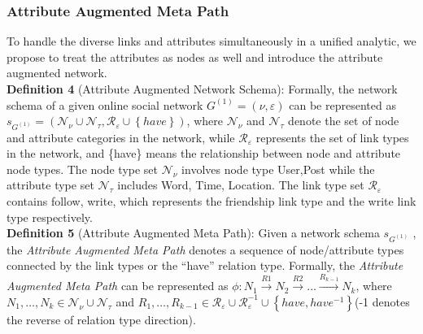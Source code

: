 \documentclass{article}
\begin{document}
\subsubsection{Attribute Augmented Meta Path}
\indent To handle the diverse links
and attributes simultaneously in a unified analytic, we propose to
treat the attributes as nodes as well and introduce the attribute
augmented network.\\
\textbf{Definition 4} (Attribute Augmented Network Schema): Formally, the network schema of a given online social network $G^{(1)} = (\nu, \varepsilon)$ can be represented as $s_{G^{(1)}} = (\mathcal{N}_{\nu}\cup\mathcal{N}_{\tau}, \mathcal{R}_{\varepsilon}\cup \left\{ have \right\})$, where $\mathcal{N}_{\nu}$ and $\mathcal{N}_{\tau}$ denote the set of node and attribute categories in the network, while $\mathcal{R}_{\varepsilon}$ represents the set of link types in the network, and \left\{have\right\} means the relationship between node and attribute node types. The node type set $\mathcal{N}_{\nu}$ involves node type {User,Post} while the attribute type set $\mathcal{N}_{\tau}$ includes {Word, Time, Location}. The link type set $\mathcal{R}_{\varepsilon}$ contains {follow, write}, which represents the friendship link type and the write link type respectively.\\
\textbf{Definition 5} (Attribute Augmented Meta Path): Given a network schema $s_{G^{(1)}}$ , the \emph{Attribute Augmented Meta Path} denotes a sequence of  node/attribute types connected by the link types or the “have” relation type. Formally, the \emph{Attribute Augmented Meta Path}
can be represented as $\phi: N_{1} \xrightarrow{R1} N_{2} \xrightarrow{R2} \dots \xrightarrow{R_{k-1}} N_{k}$, where $N_{1},\dots,N_{k} \in \mathcal{N}_{\nu} \cup \mathcal{N}_{\tau}$ and
$R_{1},\dots,R_{k-1} \in \mathcal{R}_{\varepsilon} \cup \mathcal{R}_{\varepsilon}^{-1} \cup \left\{ have, have^{-1}\right\}$(-1 denotes the reverse of relation type direction).
\end{document}
